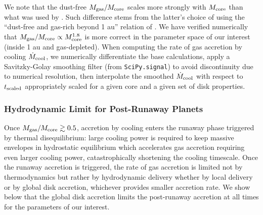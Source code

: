 \documentclass[twocolumn]{aastex631}
\begin{document}
We note that the dust-free $M_{\rm gas}/M_{\rm core}$ scales more strongly with $M_{\rm core}$ than what was used by \citet{Lee21}. Such difference stems from the latter's choice of using the ``dust-free and gas-rich beyond 1 au'' relation of \citet{Lee15}. We have verified numerically that $M_{\rm gas}/M_{\rm core} \propto M_{\rm core}^{1.8}$ is more correct in the parameter space of our interest (inside 1 au and gas-depleted). When computing the rate of gas accretion by cooling $\dot{M}_{\rm cool}$, we numerically differentiate the base calculations, apply a Savitzky-Golay smoothing filter (from \texttt{SciPy.signal}) to avoid discontinuity due to numerical resolution, then interpolate the smoothed $\dot{M}_{\rm cool}$ with respect to $t_{\rm scaled}$ appropriately scaled for a given core and a given set of disk properties. 



\subsubsection{Hydrodynamic Limit for Post-Runaway Planets}

Once $M_{\rm gas}/M_{\rm core} \gtrsim 0.5$, accretion by cooling enters the runaway phase triggered by thermal disequilibrium: large cooling power is required to keep massive envelopes in hydrostatic equilibrium which accelerates gas accretion requiring even larger cooling power, catastrophically shortening the cooling timescale. Once the runaway accretion is triggered, the rate of gas accretion is limited not by thermodynamics but rather by hydrodynamic delivery \citep[e.g.,][]{Pollack96} whether by local delivery or by global disk accretion, whichever provides smaller accretion rate. We show below that the global disk accretion limits the post-runaway accretion at all times for the parameters of our interest.
\end{document}
